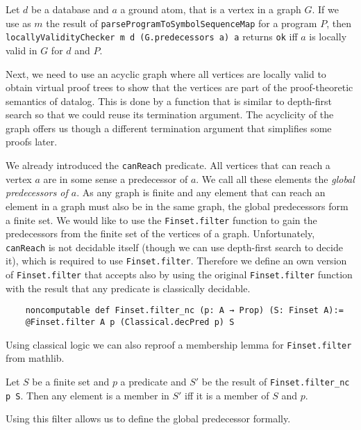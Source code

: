 \begin{lemma}
    Let $d$ be a database and $a$ a ground atom, that is a vertex in a graph $G$.
    If we use as $m$ the result of \texttt{parseProgramToSymbolSequenceMap} for a program $P$, then \texttt{locallyValidityChecker m d (G.predecessors a) a} returns \texttt{ok} iff $a$ is locally valid in $G$ for $d$ and $P$.
\end{lemma}

Next, we need to use an acyclic graph where all vertices are locally valid to obtain virtual proof trees to show that the vertices are part of the proof-theoretic semantics of datalog. This is done by a function that is similar to depth-first search so that we could reuse its termination argument. The acyclicity of the graph offers us though a different termination argument that simplifies some proofs later.

We already introduced the \texttt{canReach} predicate. All vertices that can reach a vertex $a$ are in some sense a predecessor of $a$. We call all these elements the \textit{global predecessors of $a$}. As any graph is finite and any element that can reach an element in a graph must also be in the same graph, the global predecessors form a finite set. We would like to use the \texttt{Finset.filter} function to gain the predecessors from the finite set of the vertices of a graph. Unfortunately, \texttt{canReach} is not decidable itself (though we can use depth-first search to decide it), which is required to use \texttt{Finset.filter}. Therefore we define an own version of \texttt{Finset.filter} that accepts also by using the original \texttt{Finset.filter} function with the result that any predicate is classically decidable.

\begin{lstlisting}
    noncomputable def Finset.filter_nc (p: A → Prop) (S: Finset A):= 
    @Finset.filter A p (Classical.decPred p) S
\end{lstlisting}

Using classical logic we can also reproof a membership lemma for \texttt{Finset.filter} from mathlib.

\begin{lemma}
    Let $S$ be a finite set and $p$ a predicate and $S'$ be the result of \texttt{Finset.filter\_nc p S}. Then any element is a member in $S'$ iff it is a member of $S$ and $p$.
\end{lemma}

Using this filter allows us to define the global predecessor formally.

